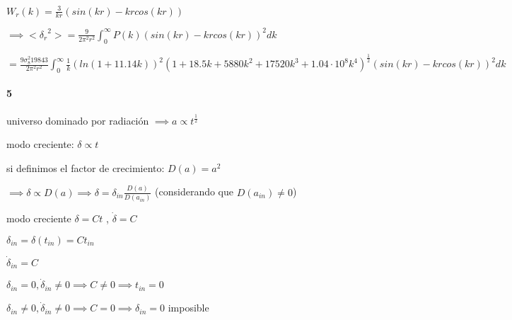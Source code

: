 \documentclass[12pt]{book}
\begin{document}
$W_r(k) = \frac{3}{kr}(sin(kr) - kr cos(kr))$ 

$\implies <{\delta_r}^2> = \frac{9 }{2\pi^2 r^2}\int_0^\infty{P(k)(sin(kr) - k r cos(kr))^2 dk }$

$= \frac{9 \sigma_8^2 19843}{2\pi^2 r^2}\int_0^\infty{\frac{1}{k}(ln(1+11.14k))^2 
(1+18.5k + 5880k^2+17520k^3 + 1.04 \cdot 10^8 k^4)^{\frac{1}{2}}(sin(kr) - k r cos(kr))^2 dk }$

\paragraph{5}

universo dominado por radiación $\implies a \propto t^\frac{1}{2}$

modo creciente: $\delta \propto t$

si definimos el factor de crecimiento: $D(a) = a^2$
 
$\implies \delta \propto D(a) \implies \delta = \delta_{in} \frac{D(a)}{D(a_{in})}$ (considerando que $D(a_{in}) \neq 0$)



modo creciente $\delta = C t$ , $\dot{\delta} = C$

$\delta_{in} = \delta(t_{in}) = C t_{in}$

$\dot{\delta}_{in} = C$

$\delta_{in} = 0 , \dot{\delta}_{in} \neq 0  \implies C \neq 0 \implies t_{in} = 0$

$\delta_{in} \neq 0 , \dot{\delta}_{in} \neq 0  \implies C = 0 \implies \delta_{in} = 0$ imposible
\end{document}
